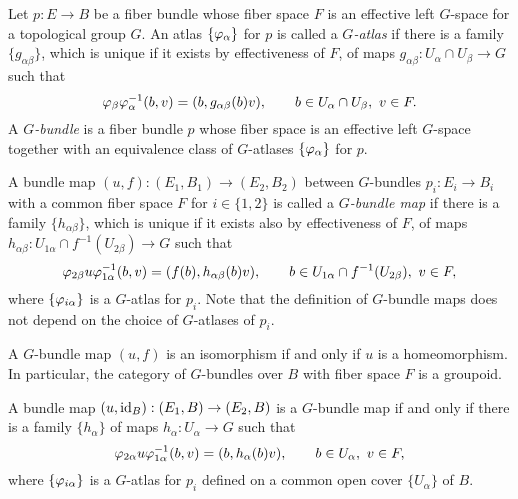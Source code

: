 \documentclass{../../large}
\begin{document}
\begin{prb}
Let $p:E\to B$ be a fiber bundle whose fiber space $F$ is an effective left $G$-space for a topological group $G$.
An atlas $\{\varphi_\alpha\}$ for $p$ is called a \emph{$G$-atlas} if there is a family $\{g_{\alpha\beta}\}$, which is unique if it exists by effectiveness of $F$, of maps $g_{\alpha\beta}:U_\alpha\cap U_\beta\to G$ such that
\[\varphi_\beta\varphi_\alpha^{-1}(b,v)=(b,g_{\alpha\beta}(b)v),
\qquad b\in U_\alpha\cap U_\beta,\ v\in F.\]
A \emph{$G$-bundle} is a fiber bundle $p$ whose fiber space is an effective left $G$-space together with an equivalence class of $G$-atlases $\{\varphi_\alpha\}$ for $p$.

A bundle map $(u,f):(E_1,B_1)\to(E_2,B_2)$ between $G$-bundles $p_i:E_i\to B_i$ with a common fiber space $F$ for $i\in\{1,2\}$ is called a \emph{$G$-bundle map} if there is a family $\{h_{\alpha\beta}\}$, which is unique if it exists also by effectiveness of $F$, of maps $h_{\alpha\beta}:U_{1\alpha}\cap f^{-1}(U_{2\beta})\to G$ such that
\[\varphi_{2\beta}u\varphi_{1\alpha}^{-1}(b,v)=(f(b),h_{\alpha\beta}(b)v),\qquad b\in U_{1\alpha}\cap f^{-1}(U_{2\beta}),\ v\in F,\]
where $\{\varphi_{i\alpha}\}$ is a $G$-atlas for $p_i$.
Note that the definition of $G$-bundle maps does not depend on the choice of $G$-atlases of $p_i$.
\begin{parts}
\item A $G$-bundle map $(u,f)$ is an isomorphism if and only if $u$ is a homeomorphism. In particular, the category of $G$-bundles over $B$ with fiber space $F$ is a groupoid.
\item A bundle map $(u,\operatorname{id}_B):(E_1,B)\to(E_2,B)$ is a $G$-bundle map if and only if there is a family $\{h_\alpha\}$ of maps $h_\alpha:U_\alpha\to G$ such that
\[\varphi_{2\alpha}u\varphi_{1\alpha}^{-1}(b,v)=(b,h_\alpha(b)v),
\qquad b\in U_\alpha,\ v\in F,\]
where $\{\varphi_{i\alpha}\}$ is a $G$-atlas for $p_i$ defined on a common open cover $\{U_\alpha\}$ of $B$.
\end{parts}
\end{prb}
\begin{pf}
\end{pf}
\end{document}
